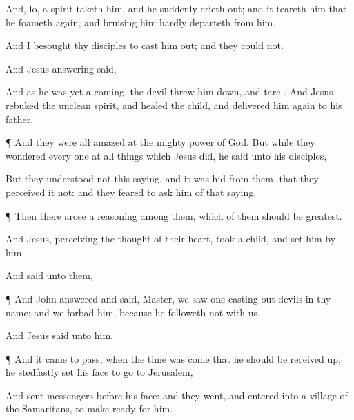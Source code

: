 {And,
lo, a
spirit
taketh
him,
and
he
suddenly crieth
out;
and it
teareth
him
that he foameth
again,
and
bruising
him
hardly
departeth
from
him.

And I
besought
thy
disciples
to
cast
him
out;
and they
could
not.

And
Jesus
answering
said,
{}

And
as
he
was
yet a
coming, the
devil
threw
him
down,
and
tare
{}.
And
Jesus
rebuked
the
unclean
spirit,
and
healed the
child,
and
delivered
him
again
to
his
father.


\par }{\PP {}¶
And they
were
all
amazed
at the mighty
power of
God.
But while they
wondered every
one
at all
things
which
Jesus
did, he
said
unto
his
disciples,


But they understood
not
this
saying,
and it
was
hid
from
them,
that they
perceived
it
not:
and they
feared to
ask
him
of
that
saying.


\par }{\PP {}¶
Then there
arose a
reasoning
among
them,
which of
them should
be
greatest.

And
Jesus,
perceiving the
thought
of
their
heart,
took a
child, and
set
him
by
him,

And
said unto
them,
{}


\par }{\PP {}¶
And
John
answered and
said,
Master, we
saw
one casting
out
devils
in
thy
name;
and we
forbad
him,
because he
followeth
not
with
us.

And
Jesus
said
unto
him,
{}


\par }{\PP {}¶
And it came to
pass,
when the
time was
come
that
he should be received
up,
he stedfastly
set
his
face to
go
to
Jerusalem,

And
sent
messengers
before
his
face:
and they
went, and
entered
into a
village of the
Samaritans,
to make
ready for
him.

}
